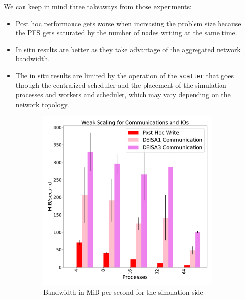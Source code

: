  We can keep in mind three takeaways from those experiments: 
 \begin{itemize}
     \item Post hoc performance gets worse when increasing the problem size because the PFS gets saturated by the number of nodes writing at the same time.
     \item In situ results are better as they take advantage of the aggregated network bandwidth.
     \item The in situ results are limited by the operation of the \texttt{scatter} that goes through the centralized scheduler and the placement of the simulation processes and workers and scheduler, which may vary depending on the network topology. 
 \end{itemize}


\begin{figure}[hb]
     \centering
     \begin{subfigure}[b]{0.45\textwidth}
         \centering
         \includegraphics[width=\textwidth, height=\textwidth]{figures/P_1vs3vspost1vspost2.pdf}
         \caption{Bandwidth in MiB per second for the simulation side}
         \label{fig:P}
     \end{subfigure}
     \hfill
     \begin{subfigure}[b]{0.45\textwidth}
         \centering

\end{subfigure}
\end{figure}
